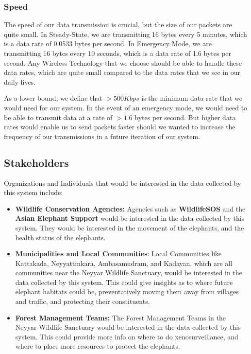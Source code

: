\subsubsection{Speed}
The speed of our data transmission is crucial, but the size of our packets are quite small. In Steady-State, we are transmitting 16 bytes every 5 minutes, which is a data rate of 0.0533 bytes per second. In Emergency Mode, we are transmitting 16 bytes every 10 seconds, which is a data rate of 1.6 bytes per second. Any Wireless Technology that we choose should be able to handle these data rates, which are quite small compared to the data rates that we see in our daily lives.

As a lower bound, we define that $> 500 Kbps$ is the minimum data rate that we would need for our system. In the event of an emergency mode, we would need to be able to transmit data at a rate of $> 1.6$ bytes per second. But higher data rates would enable us to send packets faster should we wanted to increase the frequency of our transmissions in a future iteration of our system.

\subsection{Stakeholders}

Organizations and Individuals that would be interested in the data collected by this system include: 
\begin{itemize}
    \item \textbf{Wildlife Conservation Agencies:} Agencies such as \textbf{WildlifeSOS}\cite{wildlifesos} and the \textbf{Asian Elephant Support}\cite{aecp} would be interested in the data collected by this system. They would be interested in the movement of the elephants, and the health status of the elephants.
    \item \textbf{Municipalities and Local Communities}: Local Communities like Kattakada, Neyyattinkara, Ambasamudram, and Kadayan, which are all communities near the Neyyar Wildlife Sanctuary, would be interested in the data collected by this system. This could give insights as to where future elephant habitats could be, preventatively moving them away from villages and traffic, and protecting their constituents.
    \item \textbf{Forest Management Teams:} The Forest Management Teams in the Neyyar Wildlife Sanctuary would be interested in the data collected by this system. This could provide more info on where to do xenosurveillance, and where to place more resources to protect the elephants.
\end{itemize}

